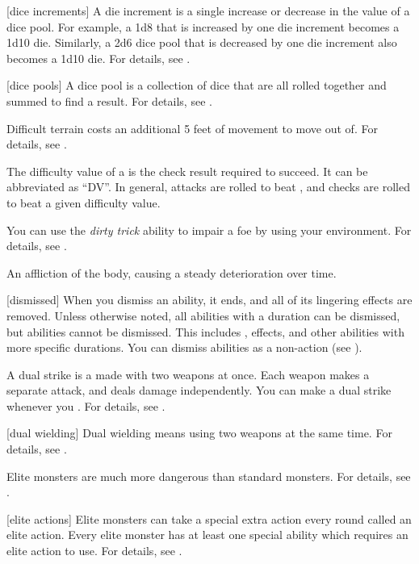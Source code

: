 [dice increments] A die increment is a single increase or decrease in the value of a dice pool.
For example, a 1d8 that is increased by one die increment becomes a 1d10 die.
Similarly, a 2d6 dice pool that is decreased by one die increment also becomes a 1d10 die.
For details, see .

[dice pools] A dice pool is a collection of dice that are all rolled together and summed to find a result.
For details, see .

 Difficult terrain costs an additional 5 feet of movement to move out of.
For details, see .

 The difficulty value of a  is the check result required to succeed.
It can be abbreviated as ``DV''.
In general, attacks are rolled to beat , and checks are rolled to beat a given difficulty value.

 You can use the \textit{dirty trick} ability to impair a foe by using your environment.
For details, see .

 An affliction of the body, causing a steady deterioration over time.

[dismissed] When you dismiss an ability, it ends, and all of its lingering effects are removed.
Unless otherwise noted, all \magical abilities with a duration can be dismissed, but  abilities cannot be dismissed.
This includes ,  effects, and other abilities with more specific durations.
You can dismiss abilities as a non-action (see ).

 A dual strike is a  made with two weapons at once.
Each weapon makes a separate attack, and deals damage independently.
You can make a dual strike whenever you .
For details, see .

[dual wielding] Dual wielding means using two weapons at the same time.
For details, see .

 Elite monsters are much more dangerous than standard monsters.
For details, see .

[elite actions] Elite monsters can take a special extra action every round called an elite action.
Every elite monster has at least one special ability which requires an elite action to use.
For details, see .

